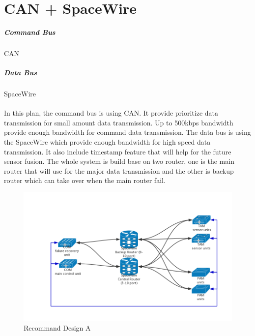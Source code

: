 \documentclass[12pt,article]{memoir}
\begin{document}
\section{CAN + SpaceWire}
\subparagraph{Command Bus}CAN
\subparagraph{Data Bus}SpaceWire\\\\
In this plan, the command bus is using CAN. It provide prioritize data transmission for small amount data transmission. Up to 500kbps bandwidth provide enough bandwidth for command data transmission. The data bus is using the SpaceWire which provide enough bandwidth for high speed data transmission. It also include timestamp feature that will help for the future sensor fusion. The whole system is build base on two router, one is the main router that will use for the major data transmission and the other is backup router which can take over when the main router fail.
\begin{figure}[htp]
\includegraphics[width=\textwidth]{DR00001_SpaceWire_1.png}
 \caption{Recommand Design A}	
\end{figure}
\clearpage
\end{document}
